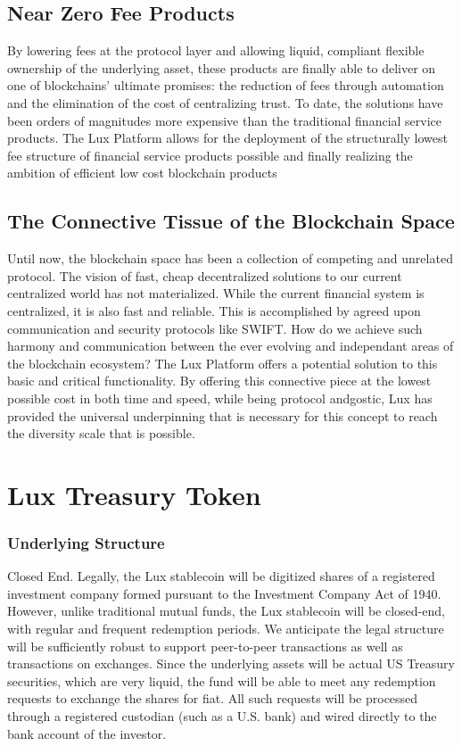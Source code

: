 \documentclass[11pt]{article}
\begin{document}
\subsection{Near Zero Fee Products}

By lowering fees at the protocol layer and allowing liquid, compliant flexible ownership of the underlying asset, these products are finally able to deliver on one of blockchains' ultimate promises: the reduction of fees through automation and the elimination of the cost of centralizing trust. To date, the solutions have been orders of magnitudes more expensive than the traditional financial service products. The Lux Platform allows for the deployment of the structurally lowest fee structure of financial service products possible and finally realizing the ambition of efficient low cost blockchain products


\subsection{The Connective Tissue of the Blockchain Space}

Until now, the blockchain space has been a collection of competing and unrelated protocol. The vision of fast, cheap decentralized solutions to our current centralized world has not materialized. While the current financial system is centralized, it is also fast and reliable. This is accomplished by agreed upon communication and security protocols like SWIFT. How do we achieve such harmony and communication between the ever evolving and independant areas of the blockchain ecosystem? The Lux Platform offers a potential solution to this basic and critical functionality. By offering this connective piece at the lowest possible cost in both time and speed, while being protocol andgostic, Lux has provided the universal underpinning that is necessary for this concept to reach the diversity scale that is possible.


\section{Lux Treasury Token}

\subsubsection{Underlying Structure}

Closed End. Legally, the Lux stablecoin will be digitized shares of a registered investment company formed pursuant to the Investment Company Act of 1940.  However, unlike traditional mutual funds, the Lux stablecoin will be closed-end, with regular and frequent redemption periods.  We anticipate the legal structure will be sufficiently robust to support peer-to-peer transactions as well as transactions on exchanges.  Since the underlying assets will be actual US Treasury securities, which are very liquid, the fund will be able to meet any redemption requests to exchange the shares for fiat.  All such requests will be processed through a registered custodian (such as a U.S. bank) and wired directly to the bank account of the investor.
\end{document}
